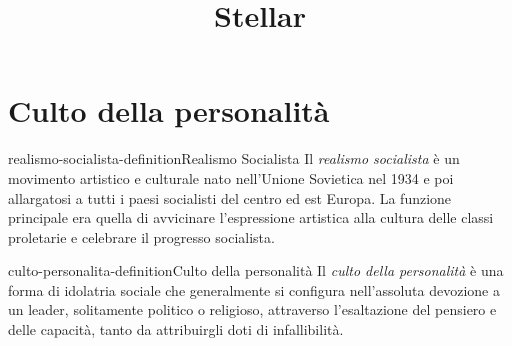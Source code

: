 \documentclass[preview]{standalone}
\begin{document}
\title{Stellar}
\genpage

\section{Culto della personalità}

\begin{snippetdefinition}{realismo-socialista-definition}{Realismo Socialista}
    Il \textit{realismo socialista} è un movimento artistico e culturale nato nell'Unione Sovietica nel 1934 e poi allargatosi a tutti i paesi socialisti del centro ed est Europa. La funzione principale era quella di avvicinare l'espressione artistica alla cultura delle classi proletarie e celebrare il progresso socialista.
\end{snippetdefinition}

\begin{snippetdefinition}{culto-personalita-definition}{Culto della personalità}
    Il \textit{culto della personalità} è una forma di idolatria sociale che
    generalmente si configura nell'assoluta devozione a un leader,
    solitamente politico o religioso, attraverso l'esaltazione del pensiero e 
    delle capacità, tanto da attribuirgli doti di infallibilità.
\end{snippetdefinition}
\end{document}

